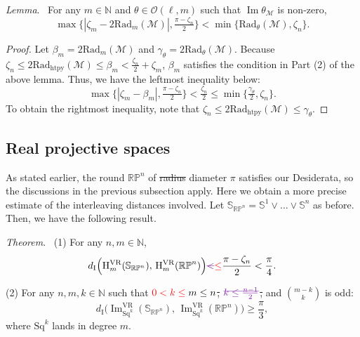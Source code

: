 \documentclass{amsart}
\theoremstyle{definition}
\newcommand{\N}{\mathbb{N}}
\newcommand{\rH}{\mathrm{H}}
\newcommand{\cM}{\mathcal{M}}
\newcommand{\cO}{\mathcal{O}}
\newcommand{\bS}{\mathbb{S}}
\newcommand{\darkblue}{\color{darkblue}}
\newcommand{\VR}{\mathrm{VR}}
\newcommand{\Sq}{\mathrm{Sq}}
\renewcommand{\theorem}{\medskip\noindent\textit{\darkblue Theorem}.\ }
\renewcommand{\lemma}{\medskip\noindent\textit{\darkblue Lemma}.\ }
\theoremstyle{theorem}
\DeclareMathOperator{\img}{Im}
\newcommand{\rp}{\mathbb{RP}}
\newcommand{\di}{d_{\mathrm{I}}}
\newcommand{\crit}{\mathrm{Rad}_{\mathrm{htpy}}}
\newcommand{\firstdeath}[2]{\mathrm{Rad}_{#1}(#2)}
\providecommand{\DIFaddtex}[1]{{\protect\color{blue}\uwave{#1}}} %
\providecommand{\DIFdeltex}[1]{{\protect\color{red}\sout{#1}}}                      %
\providecommand{\DIFaddbegin}{} %
\providecommand{\DIFaddend}{} %
\providecommand{\DIFdelbegin}{} %
\providecommand{\DIFdelend}{} %
\providecommand{\DIFadd}[1]{\texorpdfstring{\DIFaddtex{#1}}{#1}} %
\providecommand{\DIFdel}[1]{\texorpdfstring{\DIFdeltex{#1}}{}} %
\newcommand{\DIFscaledelfig}{0.5}
\newlength{\DIFdelgraphicswidth} %
\newlength{\DIFdelgraphicsheight} %
\newcommand{\DIFaddincludegraphics}[2][]{{\color{blue}\fbox{\DIFOincludegraphics[#1]{#2}}}} %
\newcommand{\DIFdelincludegraphics}[2][]{%
\sbox{\DIFdelgraphicsbox}{\DIFOincludegraphics[#1]{#2}}%
\settoboxwidth{\DIFdelgraphicswidth}{\DIFdelgraphicsbox} %
\settoboxtotalheight{\DIFdelgraphicsheight}{\DIFdelgraphicsbox} %
\scalebox{\DIFscaledelfig}{%
\parbox[b]{\DIFdelgraphicswidth}{\usebox{\DIFdelgraphicsbox}\\[-\baselineskip] \rule{\DIFdelgraphicswidth}{0em}}\llap{\resizebox{\DIFdelgraphicswidth}{\DIFdelgraphicsheight}{%
\setlength{\unitlength}{\DIFdelgraphicswidth}%
\begin{picture}(1,1)%
\thicklines\linethickness{2pt} %
{\color[rgb]{1,0,0}\put(0,0){\framebox(1,1){}}}%
{\color[rgb]{1,0,0}\put(0,0){\line( 1,1){1}}}%
{\color[rgb]{1,0,0}\put(0,1){\line(1,-1){1}}}%
\end{picture}%
}\hspace*{3pt}}} %
} %
\DeclareRobustCommand{\DIFaddbegin}{\DIFOaddbegin \let\includegraphics\DIFaddincludegraphics} %
\DeclareRobustCommand{\DIFaddend}{\DIFOaddend \let\includegraphics\DIFOincludegraphics} %
\DeclareRobustCommand{\DIFdelbegin}{\DIFOdelbegin \let\includegraphics\DIFdelincludegraphics} %
\DeclareRobustCommand{\DIFdelend}{\DIFOaddend \let\includegraphics\DIFOincludegraphics} %
\renewcommand{\DIFadd}[1]{{\color{red}#1}}
\renewcommand{\DIFdel}[1]{{\color{deletedpurple}\ifmmode\oldmath{#1}\else\sout{#1}\fi}}
\newcommand{\oldmath}[1]{{\color{deletedpurple}\mathpalette\horizontalstrike{#1}}}
\newcommand{\horizontalstrike}[2]{\sbox0{$#1#2$}\rlap{\raisebox{.5\ht0}{\rule{\wd0}{.4pt}}}\usebox0}
\newcommand{\newmath}[1]{{\color{red}#1}}
\begin{document}
\lemma
For any $m \in \N$ and $\theta \in \cO(\ell, m)$ such that $\img \theta_\cM$ is non-zero,
\[\max\big\{|\zeta_m - 2\firstdeath{m}{\cM} |, \tfrac{\pi - \zeta_n}{2}\big\} < \min\{\firstdeath{\theta}{\cM}, \zeta_n\}.\]
\begin{proof}
	Let $\beta_m = 2\firstdeath{m}{\cM}$ and $\gamma_\theta = 2\firstdeath{\theta}{\cM}$.
	Because \(\zeta_n \leq 2\crit(\cM) \leq \beta_m < \tfrac{\zeta_n}{2} + \zeta_m\), $\beta_m$ satisfies the condition in Part (2) of the above lemma.
	Thus, we have the leftmost inequality below:
	\[
	\max\big\{|\zeta_m - \beta_m|, \tfrac{\pi - \zeta_n}{2}\big\} < \tfrac{\zeta_n}{2}
	\leq
	\min\big\{\tfrac{\gamma_\theta}{2}, \zeta_n\big\}.
	\]
	To obtain the rightmost inequality, note that \(\zeta_n \leq 2\crit(\cM) \leq \gamma_\theta\).
\end{proof}

\subsection{Real projective spaces}\label{ss:distance_estimate_rpn}

As stated earlier, the round \(\rp^n\) of \DIFdelbegin \DIFdel{radius }\DIFdelend \DIFaddbegin \DIFadd{diameter }\DIFaddend \(\pi\) satisfies our Desiderata, so the discussions in the previous subsection apply.
Here we obtain a more precise estimate of the interleaving distances involved.
Let \(\bS_{\rp^n} = \bS^1 \vee \dots \vee \bS^n\) as before.
Then, we have the following result.

\theorem
(1) For any \(n,m \in \N\),
\[
\di\Big(\rH^\VR_m(\bS_{\rp^n}),\, \rH^\VR_m(\rp^n)\Big) \DIFdelbegin \DIFdel{< }\DIFdelend \DIFaddbegin \DIFadd{\leq }\DIFaddend \frac{\pi - \zeta_n}{2} < \frac{\pi}{4}.
\]

\noindent (2) For any \(n,m,k \in \N\) such that \(\newmath{0 < k \leq{}}m \leq n\)\DIFdel{, }\(\oldmath{k \leq \tfrac{n-1}{2}}\)\DIFdel{,} and \(\binom{m-k}{k}\) is odd:
\[
\di\Big(\img_{\Sq^k}^\VR(\bS_{\rp^n}),\, \img_{\Sq^k}^\VR(\rp^n)\Big) \geq \frac{\pi}{3},
\]
where $\Sq^k$ lands in degree \(m\).
\end{document}
